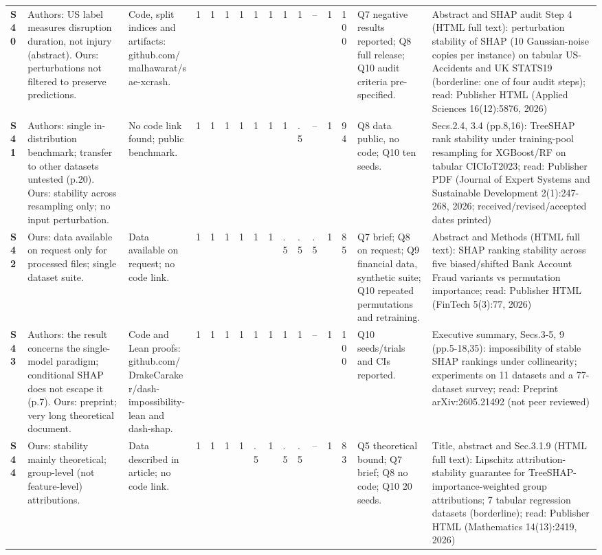 \begin{longtable}{@{}P{1.0cm}P{4.6cm}P{3.6cm}P{0.3cm}P{0.3cm}P{0.3cm}P{0.3cm}P{0.3cm}P{0.3cm}P{0.3cm}P{0.3cm}P{0.3cm}P{0.36cm}P{0.75cm}P{3.0cm}P{3.9cm}@{}}
\textbf{S40} & Authors: US label measures disruption duration, not injury (abstract). Ours: perturbations not filtered to preserve predictions. & Code, split indices and artifacts: github.com/\allowbreak{}malhawarat/\allowbreak{}sae-xcrash. & 1 & 1 & 1 & 1 & 1 & 1 & 1 & 1 & -- & 1 & 100 & Q7 negative results reported; Q8 full release; Q10 audit criteria pre-specified. & Abstract and SHAP audit Step 4 (HTML full text): perturbation stability of SHAP (10 Gaussian-noise copies per instance) on tabular US-Accidents and UK STATS19 (borderline: one of four audit steps); read: Publisher HTML (Applied Sciences 16(12):5876, 2026) \\
\textbf{S41} & Authors: single in-distribution benchmark; transfer to other datasets untested (p.20). Ours: stability across resampling only; no input perturbation. & No code link found; public benchmark. & 1 & 1 & 1 & 1 & 1 & 1 & 1 & .5 & -- & 1 & 94 & Q8 data public, no code; Q10 ten seeds. & Secs.2.4, 3.4 (pp.8,16): TreeSHAP rank stability under training-pool resampling for XGBoost/\allowbreak{}RF on tabular CICIoT2023; read: Publisher PDF (Journal of Expert Systems and Sustainable Development 2(1):247-268, 2026; received/\allowbreak{}revised/\allowbreak{}accepted dates printed) \\
\textbf{S42} & Ours: data available on request only for processed files; single dataset suite. & Data available on request; no code link. & 1 & 1 & 1 & 1 & 1 & 1 & .5 & .5 & .5 & 1 & 85 & Q7 brief; Q8 on request; Q9 financial data, synthetic suite; Q10 repeated permutations and retraining. & Abstract and Methods (HTML full text): SHAP ranking stability across five biased/\allowbreak{}shifted Bank Account Fraud variants vs permutation importance; read: Publisher HTML (FinTech 5(3):77, 2026) \\
\textbf{S43} & Authors: the result concerns the single-model paradigm; conditional SHAP does not escape it (p.7). Ours: preprint; very long theoretical document. & Code and Lean proofs: github.com/\allowbreak{}DrakeCaraker/\allowbreak{}dash-impossibility-lean and dash-shap. & 1 & 1 & 1 & 1 & 1 & 1 & 1 & 1 & -- & 1 & 100 & Q10 seeds/\allowbreak{}trials and CIs reported. & Executive summary, Secs.3-5, 9 (pp.5-18,35): impossibility of stable SHAP rankings under collinearity; experiments on 11 datasets and a 77-dataset survey; read: Preprint arXiv:2605.21492 (not peer reviewed) \\
\textbf{S44} & Ours: stability mainly theoretical; group-level (not feature-level) attributions. & Data described in article; no code link. & 1 & 1 & 1 & 1 & .5 & 1 & .5 & .5 & -- & 1 & 83 & Q5 theoretical bound; Q7 brief; Q8 no code; Q10 20 seeds. & Title, abstract and Sec.3.1.9 (HTML full text): Lipschitz attribution-stability guarantee for TreeSHAP-importance-weighted group attributions; 7 tabular regression datasets (borderline); read: Publisher HTML (Mathematics 14(13):2419, 2026) \\

\end{longtable}
